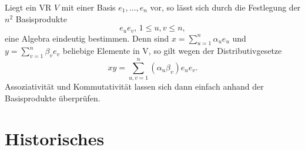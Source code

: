 \documentclass[aspectratio=169]{beamer}
\begin{document}
    \begin{frame}
        Liegt ein VR \(V\) mit einer Basis \(e_1, \dots, e_n\) vor, so lässt sich durch die Festlegung der \(n^2\) Basisprodukte
        \[
        e_u e_v,\, 1 \leq u, v \leq n,
        \]
        eine Algebra eindeutig bestimmen.
        Denn sind \(x = \sum_{u=1}^{n} \alpha_u e_u\) und  \(y = \sum_{v=1}^{n} \beta_v e_v\) beliebige Elemente in V, so gilt wegen der Distributivgesetze
        \[
            xy = \sum_{u,v=1}^{n} (\alpha_u \beta_v) e_u e_v
        .\]
        Assoziativität und Kommutativität lassen sich dann einfach anhand der Basisprodukte überprüfen.
    \end{frame}


    \section{Historisches}
\end{document}

